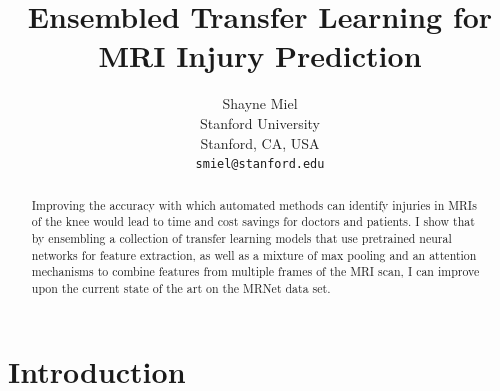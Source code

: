 \documentclass[10pt,twocolumn,letterpaper]{article}
\begin{document}
\title{Ensembled Transfer Learning for MRI Injury Prediction}

\author{Shayne Miel\\
Stanford University\\
Stanford, CA, USA\\
{\tt\small smiel@stanford.edu}
}

\maketitle

\begin{abstract}
   Improving the accuracy with which automated methods can identify injuries in
   MRIs of the knee would lead to time and cost savings for doctors and patients.
   I show that by ensembling a collection of transfer learning models that use pretrained neural networks for feature extraction, as well as a mixture of max pooling and an attention mechanisms to combine features from multiple
   frames of the MRI scan, I can improve upon the current state of the art on
   the MRNet data set.
\end{abstract}

\section{Introduction} %
\end{document}
